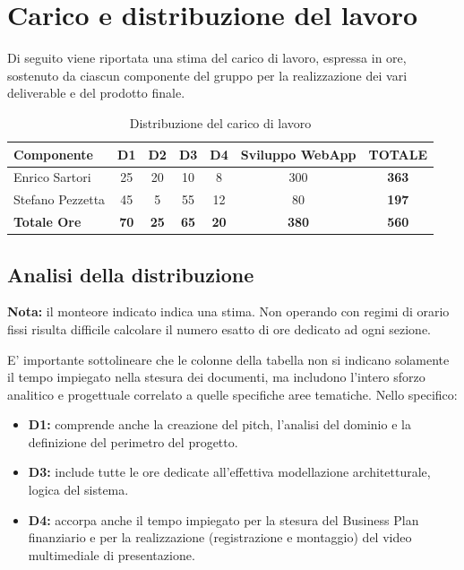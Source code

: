 \setcounter{section}{2}
\setlength{\parindent}{0pt}  %
\setlength{\parskip}{6pt}
\section{Carico e distribuzione del lavoro}

Di seguito viene riportata una stima del carico di lavoro, espressa in ore, sostenuto da ciascun componente del gruppo per la realizzazione dei vari deliverable e del prodotto finale.

\begin{table}[H]
\centering
\renewcommand{\arraystretch}{1.5}
\begin{tabular}{|l|c|c|c|c|c|c|}
\hline
\textbf{Componente} & \textbf{D1} & \textbf{D2} & \textbf{D3} & \textbf{D4} & \textbf{Sviluppo WebApp} & \textbf{TOTALE} \\ \hline
Enrico Sartori & 25 & 20 & 10 & 8 & 300 & \textbf{363} \\ \hline
Stefano Pezzetta & 45 & 5 & 55 & 12 & 80 & \textbf{197} \\ \hline
\textbf{Totale Ore} & \textbf{70} & \textbf{25} & \textbf{65} & \textbf{20} & \textbf{380} & \textbf{560} \\ \hline
\end{tabular}
\caption{Distribuzione del carico di lavoro}
\label{tab:ore_lavoro}
\end{table}

\subsection*{Analisi della distribuzione}
\textbf{Nota:} il monteore indicato indica una stima. Non operando con regimi di orario fissi risulta difficile calcolare il numero esatto di ore dedicato ad ogni sezione.

E' importante sottolineare che le colonne della tabella non si indicano solamente il tempo impiegato nella stesura dei documenti, ma includono l'intero sforzo analitico e progettuale correlato a quelle specifiche aree tematiche. Nello specifico:

\begin{itemize}
    \item \textbf{D1:} comprende anche la creazione del pitch, l'analisi del dominio e la definizione del perimetro del progetto.
    \item \textbf{D3:} include tutte le ore dedicate all'effettiva modellazione architetturale, logica del sistema.
    \item \textbf{D4:} accorpa anche il tempo impiegato per la stesura del Business Plan finanziario e per la realizzazione (registrazione e montaggio) del video multimediale di presentazione.
\end{itemize}

